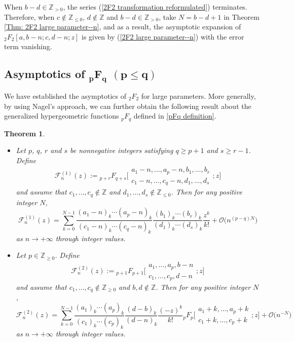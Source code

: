 \documentclass[10pt,a4paper]{amsart}
\numberwithin{equation}{section}
\newtheorem{Theorem}{Theorem}[section]
\newcommand{\ZZ}{\ensuremath{\mathbb{Z}}}
\newcommand{\mo}{\mathcal{O}}
\begin{document}
\begin{Remark}
	When $b-d\in\ZZ_{>0}$, the series (\ref{2F2 transformation reformulated}) terminates. Therefore, when $c\notin\ZZ_{\leqslant 0}$, $d\notin\ZZ$ and $b-d\in\ZZ_{>0}$, take $N=b-d+1$ in Theorem \ref{Thm: 2F2 large parameter--n}, and as a result, the asymptotic expansion of $_2F_2[a,b-n;c,d-n;z]$ is given by (\ref{2F2 large parameter--n}) with the error term vanishing.
\end{Remark}

\subsection[Asymptotics of \_pF\_q (p leqslant q)]{Asymptotics of $\boldsymbol{_pF_q}$ $\boldsymbol{(p\leqslant q)}$}

We have established the asymptotics of $_2F_2$ for large parameters. More generally, by using Nagel's approach, we can further obtain the following result about the generalized hypergeometric functions $_{p}F_{q}$ defined in \eqref{pFq definition}.

\begin{Theorem}\label{Thm: pFq large parameters}
\quad
	\begin{itemize}\itemsep=0pt	
		\item[$(1)$] Let $p$, $q$, $r$ and $s$ be nonnegative integers satisfying $q\geqslant p+1$ and $s\geqslant r-1$. Define
		\[\mathcal{F}_n^{(1)}(z):={}_{p+r}F_{q+s}\biggl[\begin{matrix}
			a_1-n,\dots,a_p-n,b_1,\dots,b_r\\
			c_1-n,\dots,c_q-n,d_1,\dots,d_s
		\end{matrix};z\biggr]\]
		and assume that $c_1,\dots,c_q\notin\ZZ$ and $d_1,\dots,d_s\notin\ZZ_{\leqslant 0}$. Then for any positive integer $N$,
		\[\mathcal{F}_n^{(1)}(z)=\sum_{k=0}^{N-1}\frac{(a_1-n)_k\cdots(a_p-n)_k}{(c_1-n)_k\cdots(c_q-n)_k}\frac{(b_1)_k\cdots(b_r)_k}{(d_1)_k
 \cdots(d_s)_k}\frac{z^k}{k!}+\mo\big(n^{(p-q)N}\big)\]
		as $n\to +\infty$ through integer values.
		
		\item[$(2)$] Let $p\in\ZZ_{\geqslant 0}$. Define
			\[\mathcal{F}_n^{(2)}(z):={}_{p+1}F_{p+1}\biggl[\begin{matrix}
				a_1,\dots,a_p,b-n\\
				c_1,\dots,c_p,d-n
			\end{matrix};z\biggr]\]
			and assume that $c_1,\dots,c_q\notin\ZZ_{\geqslant 0}$ and $b,d\notin\ZZ$. Then for any positive integer $N$,
			\[\mathcal{F}_n^{(2)}(z)=\sum_{k=0}^{N-1}\frac{(a_1)_k\cdots(a_p)_k}{(c_1)_k\cdots(c_p)_k}
 \frac{(d-b)_k}{(d-n)_k}\frac{(-z)^k}{k!}{}_{p}F_{p}\biggl[\begin{matrix}
				a_1+k,\dots,a_p+k\\
				c_1+k,\dots,c_p+k
			\end{matrix};z\biggr]+\mo\big(n^{-N}\big)\]
			as $n\to +\infty$ through integer values.
	\end{itemize}
\end{Theorem}
\end{document}
